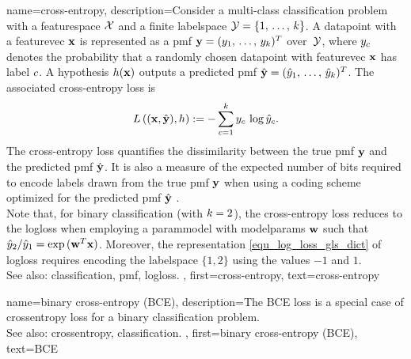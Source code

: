 {name={cross-entropy},
	description={Consider a multi-class \gls{classification} problem with a 
		\gls{featurespace} $\mathcal{X}$ and a finite \gls{labelspace} 
              	$\mathcal{Y} = \{1,\,\ldots,\,k\}$.  A \gls{datapoint} with a 
              	\gls{featurevec} ${\bf x}$ is represented as a \gls{pmf} 
              	${\bf y} = (y_{1},\,\ldots,\,y_{k})^{T}$ 
              	over~$\mathcal{Y}$, where $y_{c}$ denotes the 
              	\gls{probability} that a randomly chosen \gls{datapoint} with 
		\gls{featurevec} ${\bf x}$ has \gls{label} $c$.  
		A \gls{hypothesis} $h({\bf x})$ outputs a predicted 
              	\gls{pmf} $\hat{{\bf y}} = (\hat{y}_{1},\,\ldots,
              	\,\hat{y}_{k})^{T}$. The associated 
              	cross-\gls{entropy} \gls{loss} is \cite{coverthomas} 
             	\begin{equation}
                		\nonumber
                		L\left(({\bf x},\hat{{\bf y}}),h \right)
                		:= - \sum_{c=1}^{k} 
                		y_{c}\,\log \hat{y}_{c}.
              	\end{equation}
		The cross-\gls{entropy} \gls{loss} quantifies the dissimilarity between the true 
		\gls{pmf} ${\bf y}$ and the predicted \gls{pmf} $\hat{{\bf y}}$. It is 
		also a \gls{measure} of the expected number of bits required to encode \glspl{label} 
		drawn from the true \gls{pmf} ${\bf y}$ when using a coding scheme optimized for 
		the predicted \gls{pmf} $\hat{{\bf y}}$ \cite{coverthomas}. \\
		Note that, for binary \gls{classification} (with $k = 2$), the 
              	cross-\gls{entropy} \gls{loss} reduces to the \gls{logloss} when 
              	employing a \gls{parammodel} with \glspl{modelparam} ${\bf w}$ 
              	such that $\hat{y}_{2}/\hat{y}_{1}
              	= \exp\,({\bf w}^{T}{\bf x})$. Moreover, the representation 
              	\eqref{equ_log_loss_gls_dict} of \gls{logloss} requires encoding 
              	the \gls{labelspace} $\{1,2\}$ using the values $-1$ and $1$. 
			  \\
		See also: \gls{classification}, \gls{pmf}, \gls{logloss}. }, 
 	first={cross-entropy},
 	text={cross-entropy}
}

{name={binary cross-entropy (BCE)},
	description={The BCE \gls{loss} is a 
   		special case of \gls{crossentropy} \gls{loss} for a binary \gls{classification} problem.
		\\
		See also: \gls{crossentropy}, \gls{classification}. }, 
 	first={binary cross-entropy (BCE)},
 	text={BCE}
}


